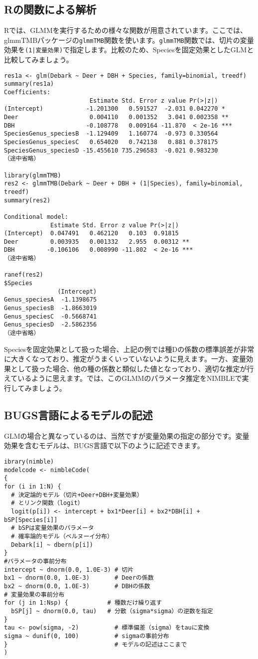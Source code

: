 \subsection{Rの関数による解析}
Rでは、GLMMを実行するための様々な関数が用意されています。ここでは、glmmTMBパッケージの\texttt{glmmTMB}関数を使います。\texttt{glmmTMB}関数では、切片の変量効果を\verb^(1|変量効果)^で指定します。比較のため、Speciesを固定効果としたGLMと比較してみましょう。
\begin{verbatim}
res1a <- glm(Debark ~ Deer + DBH + Species, family=binomial, treedf)
summary(res1a)
Coefficients:
                        Estimate Std. Error z value Pr(>|z|)    
(Intercept)            -1.201300   0.591527  -2.031 0.042270 *  
Deer                    0.004110   0.001352   3.041 0.002358 ** 
DBH                    -0.108778   0.009164 -11.870  < 2e-16 ***
SpeciesGenus_speciesB  -1.129409   1.160774  -0.973 0.330564    
SpeciesGenus_speciesC   0.654020   0.742138   0.881 0.378175    
SpeciesGenus_speciesD -15.455610 735.296583  -0.021 0.983230
（途中省略）

library(glmmTMB)
res2 <- glmmTMB(Debark ~ Deer + DBH + (1|Species), family=binomial, treedf)
summary(res2)

Conditional model:
             Estimate Std. Error z value Pr(>|z|)    
(Intercept)  0.047491   0.462120   0.103  0.91815    
Deer         0.003935   0.001332   2.955  0.00312 ** 
DBH         -0.106106   0.008990 -11.802  < 2e-16 ***
（途中省略）

ranef(res2)
$Species
               (Intercept)
Genus_speciesA  -1.1398675
Genus_speciesB  -1.8663019
Genus_speciesC  -0.5668741
Genus_speciesD  -2.5862356
（途中省略）
\end{verbatim}
Speciesを固定効果として扱った場合、上記の例では種Dの係数の標準誤差が非常に大きくなっており、推定がうまくいっていないように見えます。一方、変量効果として扱った場合、他の種の係数と類似した値となっており、適切な推定が行えているように思えます。では、このGLMMのパラメータ推定をNIMBLEで実行してみましょう。

\subsection{BUGS言語によるモデルの記述}
GLMの場合と異なっているのは、当然ですが変量効果の指定の部分です。変量効果を含むモデルは、BUGS言語で以下のように記述できます。
\begin{verbatim}
ibrary(nimble)
modelcode <- nimbleCode(
{
for (i in 1:N) {
  # 決定論的モデル（切片+Deer+DBH+変量効果）
  # とリンク関数（logit）
  logit(p[i]) <- intercept + bx1*Deer[i] + bx2*DBH[i] + bSP[Species[i]]
  # bSPは変量効果のパラメータ
  # 確率論的モデル（ベルヌーイ分布）
  Debark[i] ~ dbern(p[i])
}
#パラメータの事前分布
intercept ~ dnorm(0.0, 1.0E-3) # 切片
bx1 ~ dnorm(0.0, 1.0E-3)       # Deerの係数
bx2 ~ dnorm(0.0, 1.0E-3)       # DBHの係数
# 変量効果の事前分布
for (j in 1:Nsp) {           # 種数だけ繰り返す
  bSP[j] ~ dnorm(0.0, tau)   # 分散（sigma*sigma）の逆数を指定
}
tau <- pow(sigma, -2)          # 標準偏差（sigma）をtauに変換
sigma ~ dunif(0, 100)          # sigmaの事前分布
}                              # モデルの記述はここまで
)
\end{verbatim}
